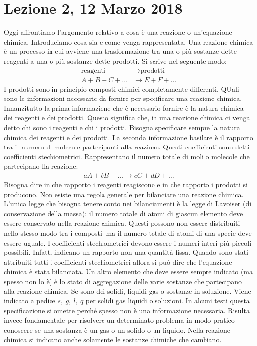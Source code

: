\documentclass[../AppuntiChimica]{subfiles}
\begin{document}
	\section{Lezione 2, 12 Marzo 2018}

	Oggi affrontiamo l'argomento relativo a cosa è una reazione o un'equazione chimica. Introduciamo cosa sia e come venga rappresentata. Una reazione chimica è un processo in cui avviene una trasformazione tra una o più sostanze dette reagenti a una o più sostanze dette prodotti. Si scrive nel seguente modo:
	\begin{align*}
	\text{reagenti}&\to \text{prodotti} \\
	A+B+C+\dots&\to E+F+\dots
	\end{align*}
	I prodotti sono in principio composti chimici completamente differenti. QUali sono le informazioni necessarie da fornire per specificare una reazione chimica. Innanzitutto la prima informazione che è necessario fornire è la natura chimica dei reagenti e dei prodotti. Questo significa che, in una reazione chimica ci venga detto chi sono i reagenti e chi i prodotti. Bisogna specificare sempre la natura chimica dei reagenti e dei prodotti. La seconda informazione basilare è il rapporto tra il numero di molecole partecipanti alla reazione. Questi coefficienti sono detti coefficienti stechiometrici. Rappresentano il numero totale di moli o molecole che partecipano lla reazione:
	\begin{gather*}
	aA+bB+\dots\to cC+dD+\dots
	\end{gather*}
	Bisogna dire in che rapporto i reagenti reagiscono e in che rapporto i prodotti si producono. Non esiste una regola generale per bilanciare una reazione chimica. L'unica legge che bisogna tenere conto nei bilanciamenti è la legge di Lavoiser (di conservazione della massa): il numero totale di atomi di giascun elemento deve essere conservato nella reazione chimica. Questi possono non essere distribuiti nello stesso modo tra i composti, ma il numero totale di atomi di una specie deve essere uguale. I coefficienti stechiometrici devono essere i numeri interi più piccoli possibili. Infatti indicano un rapporto non una quantità fissa. Quando sono stati attribuiti tutti i coefficienti stechiometrici allora si può dire che l'equazione chimica è stata bilanciata. Un altro elemento che deve essere sempre indicato (ma spesso non lo è) è lo stato di aggregazione delle varie sostanze che partecipano alla reazione chimica. Se sono dei solidi, liquidi gas o sostanze in soluzione. Viene indicato a pedice $ s,\ g,\ l,\ q $ per solidi gas liquidi o soluzioni. In alcuni testi questa specificazione si omette perché spesso non è una informazione necessaria. Risulta invece fondamentale per risolvere un determinato problema in modo pratico conoscere se una sostanza è un gas o un solido o un liquido. Nella reazione chimica si indicano anche solamente le sostanze chimiche che cambiano. 
	
\end{document}

